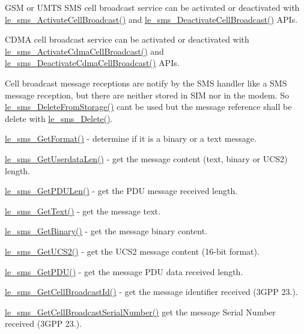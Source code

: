 G\+SM or U\+M\+TS S\+MS cell broadcast service can be activated or deactivated with \hyperlink{le__sms__interface_8h_a4607c63f325465d078514b5682347c7f}{le\+\_\+sms\+\_\+\+Activate\+Cell\+Broadcast()} and \hyperlink{le__sms__interface_8h_aa57c2f717c71b33e93f278673a7806e9}{le\+\_\+sms\+\_\+\+Deactivate\+Cell\+Broadcast()} A\+P\+Is.

C\+D\+MA cell broadcast service can be activated or deactivated with \hyperlink{le__sms__interface_8h_a45a160fea5a8f6cd195e3aff33830602}{le\+\_\+sms\+\_\+\+Activate\+Cdma\+Cell\+Broadcast()} and \hyperlink{le__sms__interface_8h_a26d43a50652431063e0a8e4d88fdba86}{le\+\_\+sms\+\_\+\+Deactivate\+Cdma\+Cell\+Broadcast()} A\+P\+Is.

Cell broadcast message receptions are notify by the S\+MS handler like a S\+MS message reception, but there are neither stored in S\+IM nor in the modem. So \hyperlink{le__sms__interface_8h_aff755186b683b94ba2788b48e28284a3}{le\+\_\+sms\+\_\+\+Delete\+From\+Storage()} can\textquotesingle{}t be used but the message reference shall be delete with \hyperlink{le__sms__interface_8h_aca1691010c88995cb47225f2889910fa}{le\+\_\+sms\+\_\+\+Delete()}.


\begin{DoxyItemize}
\item \hyperlink{le__sms__interface_8h_a5c2b8ce7043b4732c7b0ede7c5d7118c}{le\+\_\+sms\+\_\+\+Get\+Format()} -\/ determine if it is a binary or a text message.
\item \hyperlink{le__sms__interface_8h_a6165464dd3502b3c76b79b32206ba10f}{le\+\_\+sms\+\_\+\+Get\+Userdata\+Len()} -\/ get the message content (text, binary or U\+C\+S2) length.
\item \hyperlink{le__sms__interface_8h_abb89b302e564f3d55d604bb0c0dda022}{le\+\_\+sms\+\_\+\+Get\+P\+D\+U\+Len()} -\/ get the P\+DU message received length.
\item \hyperlink{le__sms__interface_8h_aebf0c28efce6ec0b9616ffa8ecb80782}{le\+\_\+sms\+\_\+\+Get\+Text()} -\/ get the message text.
\item \hyperlink{le__sms__interface_8h_af652a15437db583f333257ff5cef808d}{le\+\_\+sms\+\_\+\+Get\+Binary()} -\/ get the message binary content.
\item \hyperlink{le__sms__interface_8h_adafdc63a36a6a50c8e942bf69958789f}{le\+\_\+sms\+\_\+\+Get\+U\+C\+S2()} -\/ get the U\+C\+S2 message content (16-\/bit format).
\item \hyperlink{le__sms__interface_8h_a77555788d56f73fa52f56904cd39cd2f}{le\+\_\+sms\+\_\+\+Get\+P\+D\+U()} -\/ get the message P\+DU data received length.
\item \hyperlink{le__sms__interface_8h_aa28c1d04ff19b88100b766737610b128}{le\+\_\+sms\+\_\+\+Get\+Cell\+Broadcast\+Id()} -\/ get the message identifier received (3\+G\+PP 23.).
\item \hyperlink{le__sms__interface_8h_aa3e075b4a9396b2e4af233e4543f40bd}{le\+\_\+sms\+\_\+\+Get\+Cell\+Broadcast\+Serial\+Number()} get the message Serial Number received (3\+G\+PP 23.).
\end{DoxyItemize}

